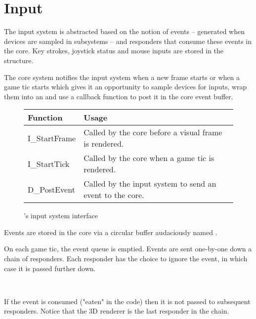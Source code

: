 \section{Input}
The input system is abstracted based on the notion of events -- generated when devices are sampled in subsystems -- and responders that consume these events in the core. Key strokes, joystick status and mouse inputs are stored in the  structure.\\
\par
{}
\par
The core system notifies the input system when a new frame starts or when a game tic starts which gives it an opportunity to sample devices for inputs, wrap them into an  and use a callback function to post it in the core event buffer.\\
\par
\begin{figure}[H]
\centering  
\begin{tabularx}{\textwidth}{ L{0.6}  L{1.4}}
  \toprule
  \textbf{Function} &  \textbf{Usage}\\
  \toprule 
  I\_StartFrame & Called by the core before a visual frame is rendered.\\
  I\_StartTick & Called by the core when a game tic is rendered.\\
  
  D\_PostEvent & Called by the input system to send an event to the core.\\
   \toprule
\end{tabularx}
\caption{\doom{}'s input system interface}
\end{figure}
\par
Events are stored in the core via a circular buffer audaciously named .\\
\par
{}

\par
On each game tic, the event queue is emptied. Events are sent one-by-one down a chain of responders. Each responder has the choice to ignore the event, in which case it is passed further down.\\
\par
{}\\
 \par If the event is consumed ("eaten" in the code) then it is not passed to subsequent responders. Notice that the 3D renderer is the last responder in the chain.\\
 

